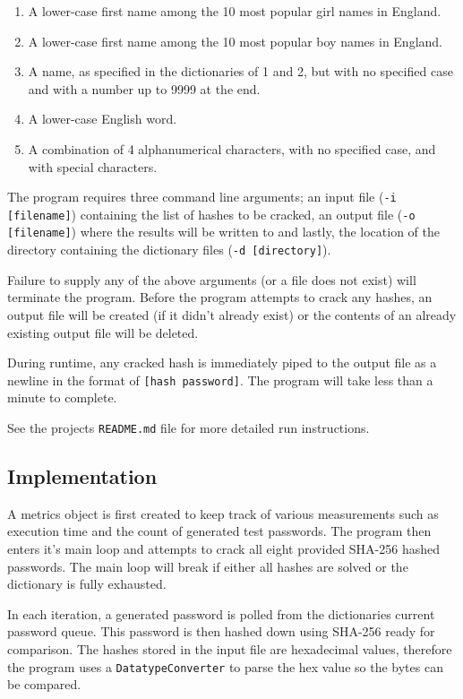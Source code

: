 \documentclass[journal,comsoc]{IEEEtran}
\begin{document}
	\begin{enumerate}
		\item A lower-case first name among the 10 most popular girl names in England.
		\item A lower-case first name among the 10 most popular boy names in England.
		\item A name, as specified in the dictionaries of 1 and 2, but with no specified case and with a number up to 9999 at the end.
		\item A lower-case English word.
		\item A combination of 4 alphanumerical characters, with no specified case, and with special characters.
	\end{enumerate}
	
	The program requires three command line arguments; an input file (\texttt{-i [filename]}) containing the list of hashes to be cracked, an output file (\texttt{-o [filename]}) where the results will be written to and lastly, the location of the directory containing the dictionary files (\texttt{-d [directory]}). 
	
	Failure to supply any of the above arguments (or a file does not exist) will terminate the program. Before the program attempts to crack any hashes, an output file will be created (if it didn't already exist) or the contents of an already existing output file will be deleted.
	
	During runtime, any cracked hash is immediately piped to the output file as a newline in the format of \texttt{[hash password]}. The program will take less than a minute to complete.
	
	See the projects \texttt{README.md} file for more detailed run instructions.
	
	\subsection{Implementation}
	
	A metrics object is first created to keep track of various measurements such as execution time and the count of generated test passwords. The program then enters it's main loop and attempts to crack all eight provided SHA-256 hashed passwords. The main loop will break if either all hashes are solved or the dictionary is fully exhausted.
	
	In each iteration, a generated password is polled from the dictionaries current password queue. This password is then hashed down using SHA-256 ready for comparison. The hashes stored in the input file are hexadecimal values, therefore the program uses a \texttt{DatatypeConverter} to parse the hex value so the bytes can be compared.
	
\end{document}
